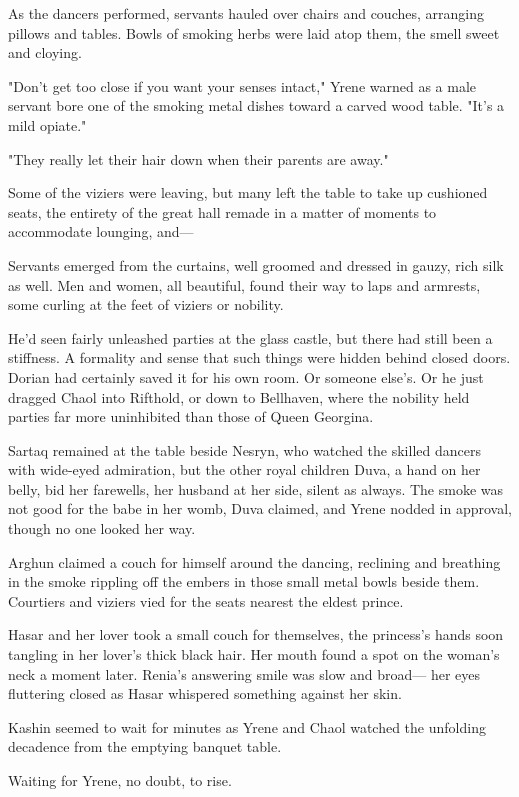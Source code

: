 As the dancers performed, servants hauled over chairs and couches, arranging pillows and tables. Bowls of smoking herbs were laid atop them, the smell sweet and cloying.

"Don't get too close if you want your senses intact," Yrene warned as a male servant bore one of the smoking metal dishes toward a carved wood table. "It's a mild opiate."

"They really let their hair down when their parents are away."

Some of the viziers were leaving, but many left the table to take up cushioned seats, the entirety of the great hall remade in a matter of moments to accommodate lounging, and---

Servants emerged from the curtains, well groomed and dressed in gauzy, rich silk as well. Men and women, all beautiful, found their way to laps and armrests, some curling at the feet of viziers or nobility.

He'd seen fairly unleashed parties at the glass castle, but there had still been a stiffness. A formality and sense that such things were hidden behind closed doors. Dorian had certainly saved it for his own room. Or someone else's. Or he just dragged Chaol into Rifthold, or down to Bellhaven, where the nobility held parties far more uninhibited than those of Queen Georgina.

Sartaq remained at the table beside Nesryn, who watched the skilled dancers with wide-eyed admiration, but the other royal children 
Duva, a hand on her belly, bid her farewells, her husband at her side, silent as always. The smoke was not good for the babe in her womb, Duva claimed, and Yrene nodded in approval, though no one looked her way.

Arghun claimed a couch for himself around the dancing, reclining and breathing in the smoke rippling off the embers in those small metal bowls beside them. Courtiers and viziers vied for the seats nearest the eldest prince.

Hasar and her lover took a small couch for themselves, the princess's hands soon tangling in her lover's thick black hair. Her mouth found a spot on the woman's neck a moment later. Renia's answering smile was slow and broad--- her eyes fluttering closed as Hasar whispered something against her skin.

Kashin seemed to wait for minutes as Yrene and Chaol watched the unfolding decadence from the emptying banquet table.

Waiting for Yrene, no doubt, to rise.

